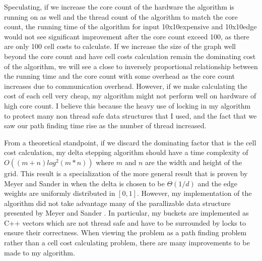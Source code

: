 \documentclass{article}
\begin{document}
Speculating, if we increase the core count of the hardware the algorithm is running on as well and
the thread count of the algorithm to match the core count, the running time of the algorithm for
input 10x10expensive and 10x10edge would not see significant improvement after the core count exceed
100, as there are only 100 cell costs to calculate. If we increase the size of the graph well beyond
the core count and have cell costs calculation remain the dominating cost of the algorithm, we will
see a close to inversely proportional relationship between the running time and the core count with
some overhead as the core count increases due to communication overhead. However, if we make
calculating the cost of each cell very cheap, my algorithm might not perform well on hardware of
high core count. I believe this because the heavy use of locking in my algorithm to protect many non
thread safe data structures that I used, and the fact that we saw our path finding time rise as the
number of thread increased.

From a theoretical standpoint, if we discard the dominating factor that is the cell cost
calculation, my delta stepping algorithm should have a time complexity of $O((m+n)log^2(m*n))$ where
\(m\) and \(n\) are the width and height of the grid. This result is a specialization of the more
general result that is proven by Meyer and Sander in \cite{Meyer-1998} when the delta is chosen to
be \(\Theta(1/d)\) and the edge weights are uniformly distributed in \([0, 1]\). However, my
implementation of the algorithm did not take advantage many of the parallizable data structure
presented by Meyer and Sander \cite{Meyer-1998}. In particular, my buckets are implemented as C++
vectors which are not thread safe and have to be surrounded by locks to ensure their correctness.
When viewing the problem as a path finding problem rather than a cell cost calculating problem,
there are many improvements to be made to my algorithm.

\printbibliography
\end{document}
